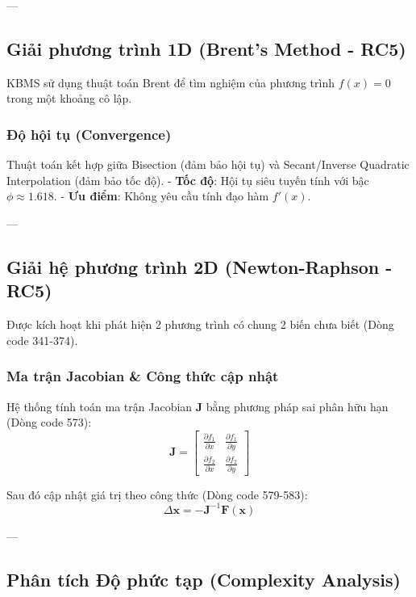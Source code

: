 ---

\subsection{Giải phương trình 1D (Brent's Method - RC5)}

KBMS sử dụng thuật toán Brent để tìm nghiệm của phương trình $f(x)=0$ trong một khoảng cô lập.

\subsubsection{Độ hội tụ (Convergence)}
Thuật toán kết hợp giữa Bisection (đảm bảo hội tụ) và Secant/Inverse Quadratic Interpolation (đảm bảo tốc độ).
- \textbf{Tốc độ}: Hội tụ siêu tuyến tính với bậc $\phi \approx 1.618$.
- \textbf{Ưu điểm}: Không yêu cầu tính đạo hàm $f'(x)$.

---

\subsection{Giải hệ phương trình 2D (Newton-Raphson - RC5)}

Được kích hoạt khi phát hiện 2 phương trình có chung 2 biến chưa biết (Dòng code 341-374).

\subsubsection{Ma trận Jacobian & Công thức cập nhật}
Hệ thống tính toán ma trận Jacobian $\mathbf{J}$ bằng phương pháp sai phân hữu hạn (Dòng code 573):
\begin{equation}
 \mathbf{J} = \begin{bmatrix} \frac{\partial f_1}{\partial x} & \frac{\partial f_1}{\partial y} \\ \frac{\partial f_2}{\partial x} & \frac{\partial f_2}{\partial y} \end{bmatrix} 
\end{equation}

Sau đó cập nhật giá trị theo công thức (Dòng code 579-583):
\begin{equation}
 \Delta \mathbf{x} = -\mathbf{J}^{-1} \mathbf{F}(\mathbf{x}) 
\end{equation}

---

\subsection{Phân tích Độ phức tạp (Complexity Analysis)}

